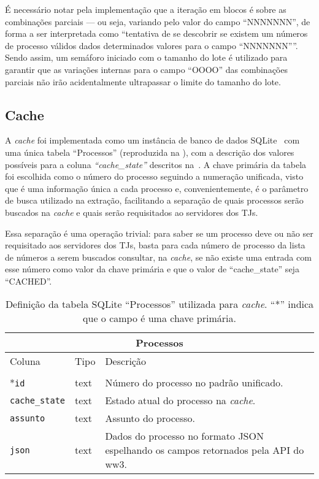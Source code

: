 É necessário notar pela implementação que a iteração em blocos é sobre as
combinações parciais --- ou seja, variando pelo valor do campo ``NNNNNNN'', de
forma a ser interpretada como ``tentativa de se descobrir se existem um números
de processo válidos dados determinados valores para o campo ``NNNNNNN''''.
Sendo assim, um semáforo iniciado com o tamanho do lote é utilizado para
garantir que as variações internas para o campo ``OOOO'' das combinações
parciais não irão acidentalmente ultrapassar o limite do tamanho do lote.

\subsection{Cache}

A \textit{cache} foi implementada como um instância de banco de dados
SQLite~\cite{tool:sqlite} com uma única tabela ``Processos'' (reproduzida na
), com a descrição dos valores possíveis
para a coluna \textit{``cache\_state''} descritos
na~. A chave primária da tabela foi escolhida
como o número do processo seguindo a numeração unificada, visto que é uma
informação única a cada processo e, convenientemente, é o parâmetro de busca
utilizado na extração, facilitando a separação de quais processos serão
buscados na \textit{cache} e quais serão requisitados ao servidores dos TJs.

Essa separação é uma operação trivial: para saber se um processo deve ou não
ser requisitado aos servidores dos TJs, basta para cada número de processo da
lista de números a serem buscados consultar, na \textit{cache}, se não existe
uma entrada com esse número como valor da chave primária e que o valor de
``cache\_state'' seja ``CACHED''.

\begin{table}[htb]
    \small
    \centering
    \begin{tabular}{llp{}}
        \toprule
        \multicolumn{3}{c}{Processos} \\
        \midrule
        Coluna & Tipo & Descrição \\
        \midrule \\
        *\texttt{id} & text & Número do processo no padrão unificado. \\
        \texttt{cache\_state} & text & Estado atual do processo na \textit{cache}. \\
        \texttt{assunto} & text & Assunto do processo. \\
        \texttt{json} & text & Dados do processo no formato JSON espelhando os campos retornados pela API do ww3. \\
        \bottomrule
    \end{tabular}
    \caption{%
        Definição da tabela SQLite ``Processos'' utilizada para \textit{cache}.
        ``*'' indica que o campo é uma chave primária.
    }
    \label{tbl:estrutura-tabela-processos}
\end{table}

